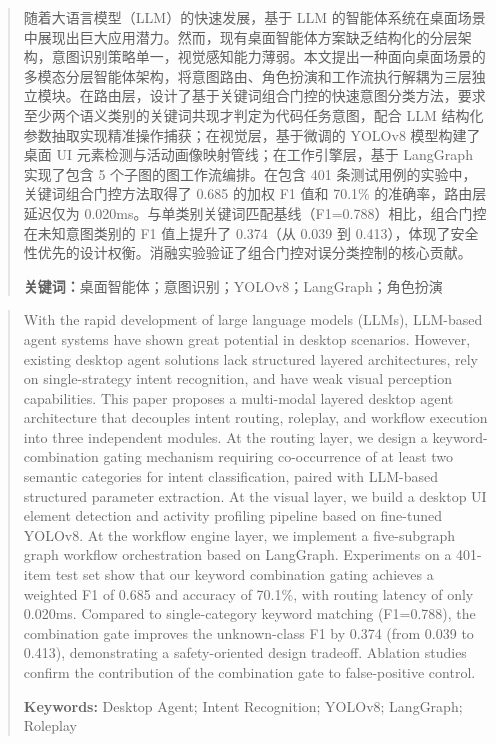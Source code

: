 \begin{abstract}
随着大语言模型（LLM）的快速发展，基于 LLM 的智能体系统在桌面场景中展现出巨大应用潜力。然而，现有桌面智能体方案缺乏结构化的分层架构，意图识别策略单一，视觉感知能力薄弱。本文提出一种面向桌面场景的多模态分层智能体架构，将意图路由、角色扮演和工作流执行解耦为三层独立模块。在路由层，设计了基于关键词组合门控的快速意图分类方法，要求至少两个语义类别的关键词共现才判定为代码任务意图，配合 LLM 结构化参数抽取实现精准操作捕获；在视觉层，基于微调的 YOLOv8 模型构建了桌面 UI 元素检测与活动画像映射管线；在工作引擎层，基于 LangGraph 实现了包含 5 个子图的图工作流编排。在包含 401 条测试用例的实验中，关键词组合门控方法取得了 0.685 的加权 F1 值和 70.1\% 的准确率，路由层延迟仅为 0.020ms。与单类别关键词匹配基线（F1=0.788）相比，组合门控在未知意图类别的 F1 值上提升了 0.374（从 0.039 到 0.413），体现了安全性优先的设计权衡。消融实验验证了组合门控对误分类控制的核心贡献。

\vspace{1em}
\noindent\textbf{关键词：}桌面智能体；意图识别；YOLOv8；LangGraph；角色扮演
\end{abstract}

\begin{abstract}
With the rapid development of large language models (LLMs), LLM-based agent systems have shown great potential in desktop scenarios. However, existing desktop agent solutions lack structured layered architectures, rely on single-strategy intent recognition, and have weak visual perception capabilities. This paper proposes a multi-modal layered desktop agent architecture that decouples intent routing, roleplay, and workflow execution into three independent modules. At the routing layer, we design a keyword-combination gating mechanism requiring co-occurrence of at least two semantic categories for intent classification, paired with LLM-based structured parameter extraction. At the visual layer, we build a desktop UI element detection and activity profiling pipeline based on fine-tuned YOLOv8. At the workflow engine layer, we implement a five-subgraph graph workflow orchestration based on LangGraph. Experiments on a 401-item test set show that our keyword combination gating achieves a weighted F1 of 0.685 and accuracy of 70.1\%, with routing latency of only 0.020ms. Compared to single-category keyword matching (F1=0.788), the combination gate improves the unknown-class F1 by 0.374 (from 0.039 to 0.413), demonstrating a safety-oriented design tradeoff. Ablation studies confirm the contribution of the combination gate to false-positive control.

\vspace{1em}
\noindent\textbf{Keywords:} Desktop Agent; Intent Recognition; YOLOv8; LangGraph; Roleplay
\end{abstract}
